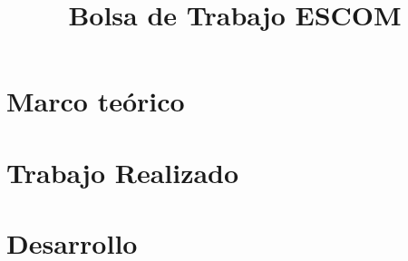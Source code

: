 \documentclass[11pt, twopages]{book}
\date{}
\title{Bolsa de Trabajo ESCOM}
\author{}
\begin{document}
    \frontmatter
        \maketitle
        \tableofcontents
        \listoffigures
        \listoftables
    \mainmatter
    

    
    \label{aloneparts:intro}

    \chapter{Marco teórico}
    \label{aloneparts:antecedentes}

    
    \chapter{Trabajo Realizado}
    \label{sprints}
    
    \chapter{Desarrollo}
        
    \appendix

        
        
        
        
        
        

    \medskip

    \printbibliography
        \printbibliography
\end{document}
